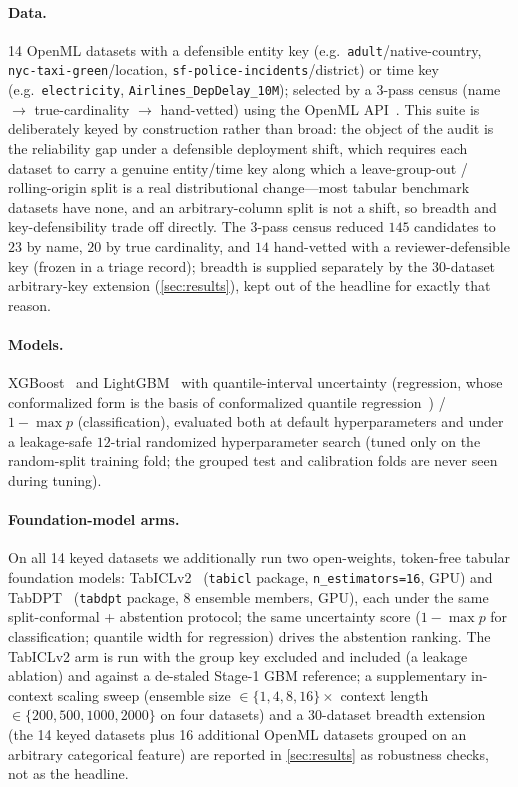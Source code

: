 \documentclass[11pt]{article}
\begin{document}
\paragraph{Data.} 14 OpenML datasets with a defensible entity key (e.g.\ \texttt{adult}/native-country,
\texttt{nyc-taxi-green}/location, \texttt{sf-police-incidents}/district) or time key (e.g.\ \texttt{electricity},
\texttt{Airlines\_DepDelay\_10M}); selected by a 3-pass census (name $\to$ true-cardinality $\to$ hand-vetted)
using the OpenML API~\citep{vanschoren2014openml}.
This suite is deliberately keyed by construction rather than broad: the object of the audit is the
reliability gap under a defensible deployment shift, which requires each dataset to carry a genuine
entity/time key along which a leave-group-out / rolling-origin split is a real distributional change---most
tabular benchmark datasets have none, and an arbitrary-column split is not a shift, so breadth and
key-defensibility trade off directly. The 3-pass census reduced $145$ candidates to $23$ by name, $20$ by true cardinality, and
$14$ hand-vetted with a reviewer-defensible key (frozen in a triage record); breadth is supplied
separately by the $30$-dataset arbitrary-key extension (\cref{sec:results}), kept out of the headline for
exactly that reason.
\paragraph{Models.} XGBoost~\citep{chen2016xgboost} and LightGBM~\citep{ke2017lightgbm} with quantile-interval uncertainty
(regression, whose conformalized form is the basis of conformalized quantile regression~\citep{romano2019cqr}) / $1-\max p$ (classification), evaluated both at default hyperparameters and under a
leakage-safe $12$-trial randomized hyperparameter search (tuned only on the random-split training fold; the
grouped test and calibration folds are never seen during tuning).
\paragraph{Foundation-model arms.} On all 14 keyed datasets we additionally run two open-weights, token-free
tabular foundation models: TabICLv2~\citep{qu2026tabicl} (\texttt{tabicl} package, \texttt{n\_estimators=16},
GPU) and TabDPT~\citep{ma2024tabdpt} (\texttt{tabdpt} package, $8$ ensemble members, GPU), each under the same
split-conformal + abstention protocol; the same uncertainty score ($1-\max p$ for classification; quantile
width for regression) drives the abstention ranking. The TabICLv2 arm is run with the group key excluded and
included (a leakage ablation) and against a de-staled Stage-1 GBM reference; a supplementary in-context scaling
sweep (ensemble size $\in\{1,4,8,16\}\times$ context length $\in\{200,500,1000,2000\}$ on four datasets) and a
$30$-dataset breadth extension (the 14 keyed datasets plus 16 additional OpenML datasets grouped on an
arbitrary categorical feature) are reported in \cref{sec:results} as robustness checks, not as the headline.
\end{document}
